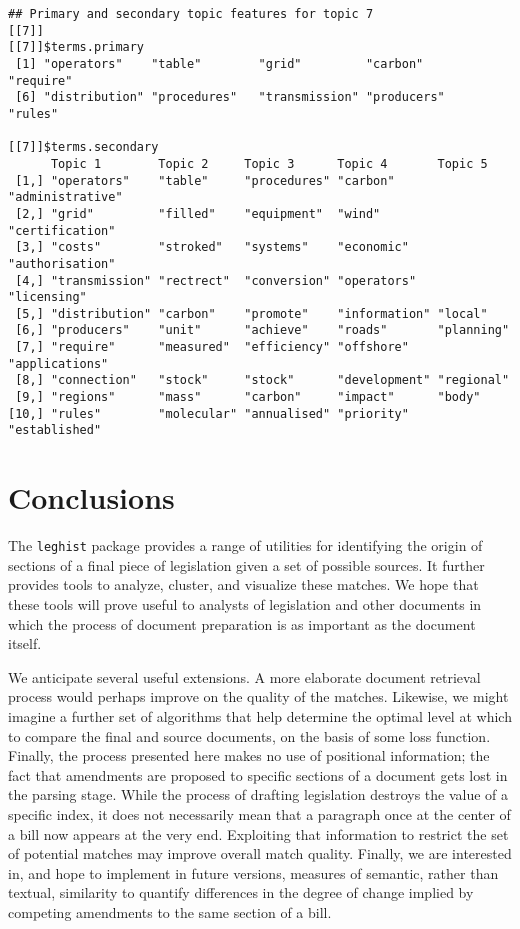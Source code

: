 \documentclass[11pt]{article}
\begin{document}
\begin{verbatim}
## Primary and secondary topic features for topic 7 
[[7]]
[[7]]$terms.primary
 [1] "operators"    "table"        "grid"         "carbon"       "require"     
 [6] "distribution" "procedures"   "transmission" "producers"    "rules"       

[[7]]$terms.secondary
      Topic 1        Topic 2     Topic 3      Topic 4       Topic 5         
 [1,] "operators"    "table"     "procedures" "carbon"      "administrative"
 [2,] "grid"         "filled"    "equipment"  "wind"        "certification" 
 [3,] "costs"        "stroked"   "systems"    "economic"    "authorisation" 
 [4,] "transmission" "rectrect"  "conversion" "operators"   "licensing"     
 [5,] "distribution" "carbon"    "promote"    "information" "local"         
 [6,] "producers"    "unit"      "achieve"    "roads"       "planning"      
 [7,] "require"      "measured"  "efficiency" "offshore"    "applications"  
 [8,] "connection"   "stock"     "stock"      "development" "regional"      
 [9,] "regions"      "mass"      "carbon"     "impact"      "body"          
[10,] "rules"        "molecular" "annualised" "priority"    "established" 
\end{verbatim}


\section{Conclusions}
\label{sec:conclusions}

The \texttt{leghist} package provides a range of utilities for
identifying the origin of sections of a final piece of legislation
given a set of possible sources. It further provides tools to analyze,
cluster, and visualize these matches. We hope that these tools will
prove useful to analysts of legislation and other documents in which
the process of document preparation is as important as the document
itself. 

We anticipate several useful extensions. A more elaborate document
retrieval process would perhaps improve on the quality of the
matches. Likewise, we might imagine a further set of algorithms that
help determine the optimal level at which to compare the final and
source documents, on the basis of some loss function. Finally, the
process presented here makes no use of positional information; the
fact that amendments are proposed to specific sections of a document
gets lost in the parsing stage. While the process of drafting
legislation destroys the value of a specific index, it does not
necessarily mean that a paragraph once at the center of a bill now
appears at the very end. Exploiting that information to restrict the
set of potential matches may improve overall match quality. Finally,
we are interested in, and hope to implement in future versions,
measures of semantic, rather than textual, similarity to quantify
differences in the degree of change implied by competing amendments to
the same section of a bill. 





\end{document}
